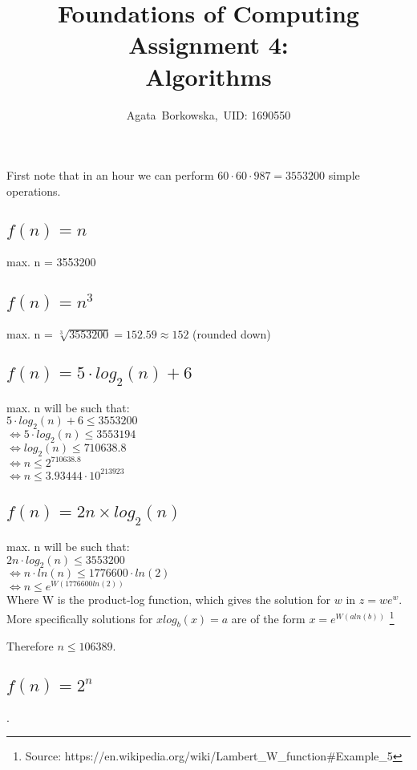 \documentclass[tikz]{article}
\begin{document}
\title{Foundations of Computing Assignment 4: \\
	Algorithms}
\author{Agata~Borkowska,~UID: 1690550}
\maketitle

\section{}
First note that in an hour we can perform $60 \cdot 60 \cdot 987 = 3553200$ simple operations.
\subsection{$f(n) = n$}
max. n = 3553200
\subsection{$f(n) = n^3$}
max. n = $\sqrt[3]{3553200} = 152.59 \approx 152 $ (rounded down)
\subsection{$f(n) = 5 \cdot log_2(n) + 6$}
max. n will be such that:\\
$5 \cdot log_2(n) + 6 \leq 3553200$\\
$\iff 5 \cdot log_2(n) \leq 3553194 $\\
$\iff log_2(n) \leq 710638.8$ \\
$ \iff n \leq 2^{710638.8}$ \\
$ \iff n \leq 3.93444 \cdot 10^{213923}$
\subsection{$f(n) = 2n \times log_2(n)$}
max. n will be such that:\\
$2n \cdot log_2(n) \leq 3553200$\\
$ \iff n \cdot ln(n) \leq 1776600 \cdot ln(2)$\\
$\iff n \leq e^{W(1776600ln(2))}$\\
Where W is the product-log function, which gives the solution for $w$ in $z = we^w$. More specifically solutions for $xlog_b(x) = a$ are of the form $x = e^{W(aln(b))}$ \footnote{Source: https://en.wikipedia.org/wiki/Lambert\_W\_function\#Example\_5}

Therefore $n \leq 106389$.
\subsection{$f(n) = 2^n$}.
\end{document}
